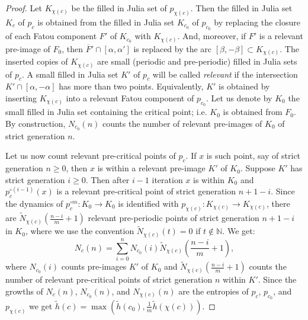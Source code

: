 \documentclass[12pt]{amsart}
\newcommand{\N}{\mathbb N}
\newcommand{\0}{\texttt{0}}
\newcommand{\1}{\texttt{1}}
\theoremstyle{definition}
\numberwithin{equation}{section}
\begin{document}
\begin{proof}
Let $K_{\chi(c)}$ be the filled in Julia set of $p_{\chi(c)}$. Then the filled in Julia set $K_c$ of $p_c$ is obtained from the filled in Julia set $K_{c_0}$ of $p_{c_0}$ by replacing the closure of each Fatou component $F'$ of $K_{c_0}$ with $K_{\chi(c)}$. And, moreover, if $F'$ is a relevant pre-image of $F_0$, then $\overline  F'\cap [\alpha,\alpha']$ is replaced by the arc $[\beta,-\beta]\subset K_{\chi(c)}$. The inserted copies of $ K_{\chi(c)}$ are small (periodic and pre-periodic) filled in Julia sets of $p_c$. A small filled in Julia set $K'$ of $p_c$ will be called \emph{relevant} if the intersection $K'\cap [\alpha,-\alpha]$ has more than two points. Equivalently, $K'$ is obtained by inserting $K_{\chi(c)}$ into a relevant Fatou component of $p_{c_0}$. Let us denote by $K_0$ the small filled in Julia set containing the critical point; i.e. $K_0$ is obtained from $F_0$. By construction, $N_{c_0}(n)$ counts the number of relevant pre-images of $K_0$ of strict generation $n$.


Let us now count relevant pre-critical points of $p_c$. If $x$ is such point, say of strict generation $n\ge 0$, then $x$ is within a relevant pre-image $K'$ of $K_0$. Suppose $K'$ has strict generation $i\ge 0$. Then after $i-1$ iteration $x$ is within $K_0$ and $p_c^{\circ (i-1)}(x)$ is a relevant pre-critical point of strict generation $n+1-i$. Since the dynamics of $p_c^{\circ m}:K_0\to K_0$ is identified with $p_{\chi(c)}:K_{\chi(c)}\to K_{\chi(c)}$, there are $\tilde N_{\chi(c)}\left(\frac{n-i}{m}+1\right)$ relevant pre-periodic points of strict generation $n+1-i$ in $K_0$, where we use the convention $\tilde N_{\chi (c)}(t)=0$ if $t\not\in \N$. We get: 
\begin{equation}
\label{eq:Lem:Renorm}
N_c(n)=\sum_{i=0}^{n}  N_{c_0}(i) \tilde N_{\chi(c)}\left(\frac{n-i}{m}+1\right),
\end{equation}
where $N_{c_0}(i)$ counts pre-images $K'$ of $K_0$ and $\tilde N_{\chi(c)}\left(\frac{n-i}{m}+1\right)$ counts the number of relevant pre-critical points of strict generation $n$ within $K'$. Since the growths of $N_c(n)$, $N_{c_0}(n)$, and $ N_{\chi(c)}(n)$ are the entropies of $p_c$, $p_{c_0}$, and $p_{\chi(c)}$ we get $\tilde h(c)=\max\left(\tilde h(c_0),\frac 1 m\tilde h(\chi( c))\right)$.  
\end{proof}




\end{document}
